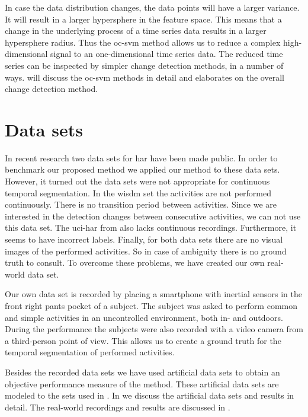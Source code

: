 In case the data distribution changes, the data points will have a larger variance.
It will result in a larger hypersphere in the feature space.
This means that a change in the underlying process of a time series data results in a larger hypersphere radius.
Thus the \gls{oc-svm} method allows us to reduce a complex high-dimensional signal to an one-dimensional time series data.
The reduced time series can be inspected by simpler change detection methods, in a number of ways.
 will discuss the \gls{oc-svm} methods in detail and  elaborates on the overall change detection method.

\section{Data sets}
In recent research two data sets for \gls{har} have been made public.
In order to benchmark our proposed method we applied our method to these data sets.
However, it turned out the data sets were not appropriate for continuous temporal segmentation.
In the \gls{wisdm} set \cite{kwapisz2011activity} the activities are not performed continuously.
There is no transition period between activities.
Since we are interested in the detection changes between consecutive activities, we can not use this data set.
The \gls{uci-har} from \cite{anguita2012human} also lacks continuous recordings.
Furthermore, it seems to have incorrect labels.
Finally, for both data sets there are no visual images of the performed activities.
So in case of ambiguity there is no ground truth to consult.
To overcome these problems, we have created our own real-world data set.

Our own data set is recorded by placing a smartphone with inertial sensors in the front right pants pocket of a subject.
The subject was asked to perform common and simple activities in an uncontrolled environment, both in- and outdoors.
During the performance the subjects were also recorded with a video camera from a third-person point of view.
This allows us to create a ground truth for the temporal segmentation of performed activities.

Besides the recorded data sets we have used artificial data sets to obtain an objective performance measure of the method.
These artificial data sets are modeled to the sets used in \cite{camci2010change,takeuchi2006unifying}.
In  we discuss the artificial data sets and results in detail.
The real-world recordings and results are discussed in .

